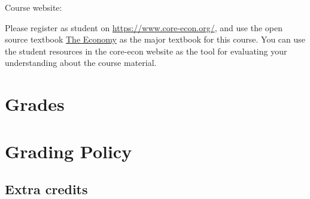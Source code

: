 \documentclass[12pt]{article}
\begin{document}
Course website:

Please register as student on \href{https://www.core-econ.org/}{https://www.core-econ.org/}, and use the open source textbook \href{https://www.core-econ.org/the-economy/book/text/0-3-contents.html}{The Economy} as the major textbook for this course.
You can use the student resources in the core-econ website as the tool for evaluating your understanding about the course material.

\section*{Grades}

\section*{Grading Policy}


\subsection*{Extra credits}
\end{document}
